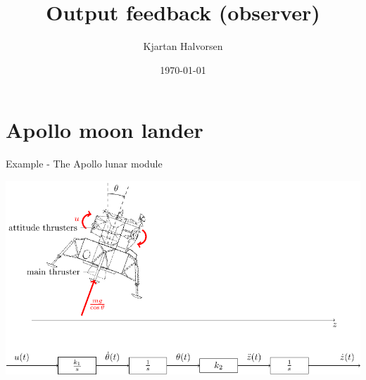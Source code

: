 \documentclass[presentation,aspectratio=1610]{beamer}
\author{Kjartan Halvorsen}
\date{\today}
\title{Output feedback (observer)}
\begin{document}
\maketitle

\section{Apollo moon lander}
\label{sec:orgf367148}
\begin{frame}[label={sec:orga00b35e}]{Example - The Apollo lunar module}
\begin{center}
\includegraphics[width=\linewidth]{fig-apollo}
\end{center}
\end{frame}
\end{document}
